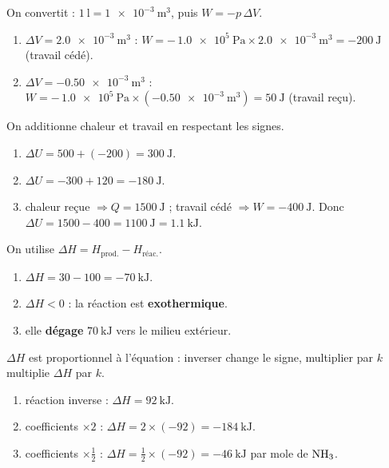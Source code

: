 \documentclass[11pt,a4paper]{article}
\begin{document}
\begin{corrige}
On convertit : $\qty{1}{\litre}=\qty{1e-3}{\cubic\metre}$, puis $W=-p\,\Delta V$.
\begin{enumerate}[label=\alph*)]
  \item $\Delta V = \qty{+2.0e-3}{\cubic\metre}$ : $W = -\,\qty{1.0e5}{\pascal}\times \qty{2.0e-3}{\cubic\metre} = \qty{-200}{\joule}$ (travail cédé).
  \item $\Delta V = \qty{-0.50e-3}{\cubic\metre}$ : $W = -\,\qty{1.0e5}{\pascal}\times(\qty{-0.50e-3}{\cubic\metre}) = \qty{+50}{\joule}$ (travail reçu).
\end{enumerate}
\end{corrige}

\begin{corrige}[appliquer $\Delta U = Q + W$]
On additionne chaleur et travail en respectant les signes.
\begin{enumerate}[label=\alph*)]
  \item $\Delta U = 500 + (-200) = \qty{+300}{\joule}$.
  \item $\Delta U = -300 + 120 = \qty{-180}{\joule}$.
  \item chaleur reçue $\Rightarrow Q=\qty{+1500}{\joule}$ ; travail cédé $\Rightarrow W=\qty{-400}{\joule}$. Donc $\Delta U = 1500 - 400 = \qty{+1100}{\joule}=\qty{+1.1}{\kilo\joule}$.
\end{enumerate}
\end{corrige}

\begin{corrige}
On utilise $\Delta H = H_{\text{prod.}}-H_{\text{réac.}}$.
\begin{enumerate}[label=\alph*)]
  \item $\Delta H = 30 - 100 = \qty{-70}{\kilo\joule}$.
  \item $\Delta H<0$ : la réaction est \textbf{exothermique}.
  \item elle \textbf{dégage} $\qty{70}{\kilo\joule}$ vers le milieu extérieur.
\end{enumerate}
\end{corrige}

\begin{corrige}
$\Delta H$ est proportionnel à l'équation : inverser change le signe, multiplier par $k$ multiplie $\Delta H$ par $k$.
\begin{enumerate}[label=\alph*)]
  \item réaction inverse : $\Delta H = \qty{+92}{\kilo\joule}$.
  \item coefficients $\times 2$ : $\Delta H = 2\times(-92) = \qty{-184}{\kilo\joule}$.
  \item coefficients $\times \tfrac12$ : $\Delta H = \tfrac12\times(-92) = \qty{-46}{\kilo\joule}$ par mole de $\ce{NH3}$.
\end{enumerate}
\end{corrige}
\end{document}
